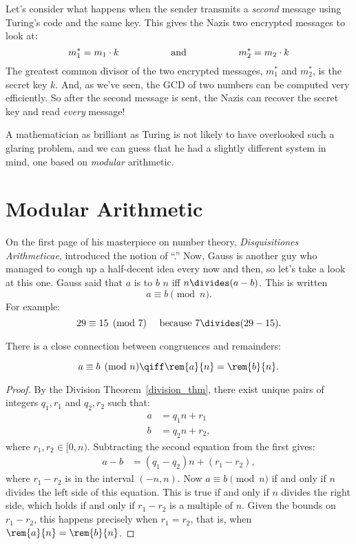 Let's consider what happens when the sender transmits a
\emph{second} message using Turing's code and the same key.  This
gives the Nazis two encrypted messages to look at:
%
\[
m_1^* = m_1 \cdot k
\hspace{0.75in} \text{and} \hspace{0.75in}
m_2^* = m_2 \cdot k
\]
%
The greatest common divisor of the two encrypted messages, $m_1^*$ and
$m_2^*$, is the secret key $k$.  And, as we've seen, the GCD of two
numbers can be computed very efficiently.  So after the second message is
sent, the Nazis can recover the secret key and read \emph{every}
message!

A mathematician as brilliant as Turing is not likely to have
overlooked such a glaring problem, and we can guess that he had a
slightly different system in mind, one based on \emph{modular}
arithmetic.


\section{Modular Arithmetic}
\label{modular_arithmeric_sec}


On the first page of his masterpiece on number theory, \emph{Disquisitiones
  Arithmeticae},  introduced the notion of
``.''  Now, Gauss is another guy who managed to cough up a
half-decent idea every now and then, so let's take a look at this one.
Gauss said that $a$ is  to $b$  $n$ iff $n
\divides (a - b)$.  This is written 
\[
a \equiv b \pmod{n}.
\]
For example:
%
\[
29 \equiv 15 \pmod{7}  \quad\text{ because }  7 \divides (29 - 15).
\]

There is a close connection between congruences and remainders:
\begin{lemma}[Remainder]
\label{lem:conrem}
\[
a \equiv b \pmod{n} \qiff \rem{a}{n} = \rem{b}{n}.
\]
\end{lemma}

\begin{proof}
By the Division Theorem~\ref{division_thm}, there exist unique pairs
of integers $q_1, r_1$ and $q_2, r_2$ such that:
%
\begin{align*}
a & = q_1 n + r_1\\
b & = q_2 n + r_2,
\end{align*}
where $r_1,r_2 \in [0,n)$.
Subtracting the second equation from the first gives:
\begin{align*}
a - b & = (q_1 - q_2) n + (r_1 - r_2),
\end{align*}
where $r_1 - r_2$ is in the interval $(-n,n)$.  Now $a \equiv b
\pmod{n}$ if and only if $n$ divides the left side of this equation.
This is true if and only if $n$ divides the right side, which holds if
and only if $r_1 - r_2$ is a multiple of $n$.  Given the bounds on
$r_1 - r_2$, this happens precisely when $r_1 = r_2$, that is, when
$\rem{a}{n} = \rem{b}{n}$.
\end{proof}

